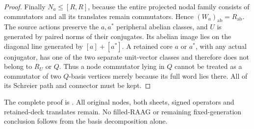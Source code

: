 \begin{proof}
Finally $N_a\le[R,R]$, because the entire projected nodal family
consists of commutators and all its translates remain commutators.
Hence $(W_a)_{\mathrm{ab}}=R_{\mathrm{ab}}$. The source actions
preserve the $a,a^*$ peripheral abelian classes, and $U$ is generated
by paired norms of their conjugates. Its abelian image lies on the
diagonal line generated by $[a]+[a^*]$. A retained core $a$ or $a^*$,
with any actual conjugator, has one of the two separate unit-vector
classes and therefore does not belong to $R_U$ or $Q$.
Thus a node commutator lying in $Q$ cannot be treated as a commutator
of two $Q$-basis vertices merely because its full word lies there.
All of its Schreier path and connector must be kept.
\end{proof}
The complete proof is
.
All original nodes, both sheets, signed operators and retained-deck
translates remain. No filled-RAAG or remaining fixed-generation
conclusion follows from the basis decomposition alone.
